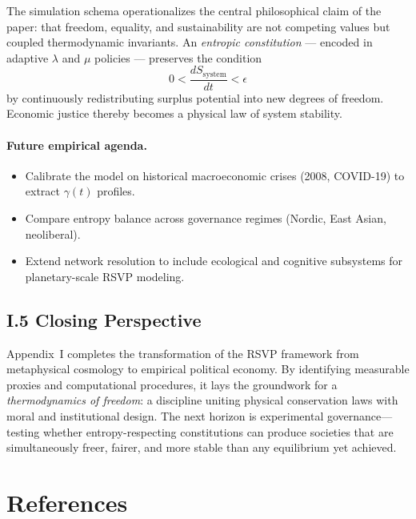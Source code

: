 \documentclass[11pt,a4paper,titlepage]{article}
\theoremstyle{definition}
\begin{document}
\begin{itemize}
The simulation schema operationalizes the central philosophical claim of the paper:  
that freedom, equality, and sustainability are not competing values but coupled thermodynamic invariants.  
An \emph{entropic constitution} — encoded in adaptive $\lambda$ and $\mu$ policies —
preserves the condition
\[
0 < \frac{dS_{\text{system}}}{dt} < \epsilon
\]
by continuously redistributing surplus potential into new degrees of freedom.  
Economic justice thereby becomes a physical law of system stability.

\paragraph{Future empirical agenda.}
\begin{itemize}
\item Calibrate the model on historical macroeconomic crises (2008, COVID-19) to extract $\gamma(t)$ profiles.  
\item Compare entropy balance across governance regimes (Nordic, East Asian, neoliberal).  
\item Extend network resolution to include ecological and cognitive subsystems for planetary-scale RSVP modeling.
\end{itemize}

\subsection*{I.5 Closing Perspective}

Appendix~I completes the transformation of the RSVP framework from metaphysical cosmology to empirical political economy.  
By identifying measurable proxies and computational procedures, it lays the groundwork for a \emph{thermodynamics of freedom}: a discipline uniting physical conservation laws with moral and institutional design.  
The next horizon is experimental governance—testing whether entropy-respecting constitutions can produce societies that are simultaneously freer, fairer, and more stable than any equilibrium yet achieved.

\section*{References}
\begin{thebibliography}{99}


\end{thebibliography}
\end{itemize}
\end{document}
